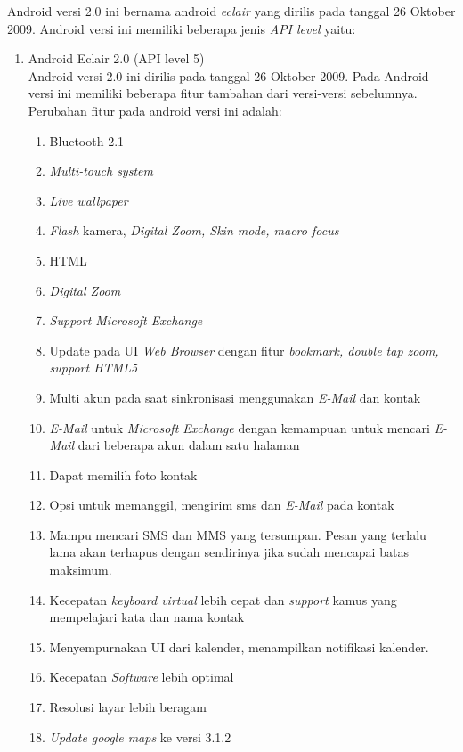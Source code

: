 \begin{enumerate}
Android versi 2.0 ini bernama android \textit{eclair} yang dirilis pada tanggal 26 Oktober 2009. Android versi ini memiliki beberapa jenis \textit{API level} yaitu:
\begin{enumerate}
    \item Android Eclair 2.0 (API level 5)\\
    Android versi 2.0 ini dirilis pada tanggal 26 Oktober 2009. Pada Android versi ini memiliki beberapa fitur tambahan dari versi-versi sebelumnya. Perubahan fitur pada android versi ini adalah:
    \begin{enumerate}
        \item Bluetooth 2.1
        \item \textit{Multi-touch system}
        \item \textit{Live wallpaper}
        \item \textit{Flash} kamera, \textit{Digital Zoom, Skin mode, macro focus}
        \item HTML
        \item \textit{Digital Zoom}
        \item \textit{Support Microsoft Exchange}
        \item Update pada UI \textit{Web Browser} dengan fitur \textit{bookmark, double tap zoom, support HTML5}
        \item Multi akun pada saat sinkronisasi menggunakan \textit{E-Mail} dan kontak
        \item \textit{E-Mail} untuk \textit{Microsoft Exchange} dengan kemampuan untuk mencari \textit{E-Mail} dari beberapa akun dalam satu halaman
        \item Dapat memilih foto kontak
        \item Opsi untuk memanggil, mengirim sms dan \textit{E-Mail} pada kontak 
        \item Mampu mencari SMS dan MMS yang tersumpan. Pesan yang terlalu lama akan terhapus dengan sendirinya jika sudah mencapai batas maksimum.
        \item Kecepatan \textit{keyboard virtual} lebih cepat dan \textit{support} kamus yang mempelajari kata dan nama kontak
        \item Menyempurnakan UI dari kalender, menampilkan notifikasi kalender.
        \item Kecepatan \textit{Software} lebih optimal
        \item Resolusi layar lebih beragam
        \item \textit{Update google maps} ke versi 3.1.2
    \end{enumerate}
    

\end{enumerate}
\end{enumerate}
